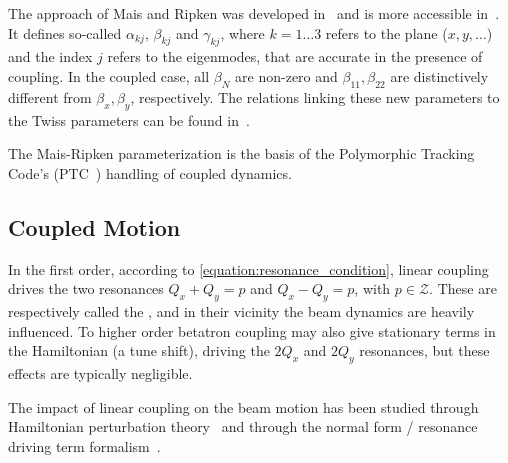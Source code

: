 The approach of Mais and Ripken was developed in~\cite{REPORT:Ripken:AllGerman} and is more accessible in~\cite{AIP:Willeke:Methods_Beam_Optics, REPORT:Borchardt:Calculation_Beam_Envelopes}.
It defines so-called  \(\alpha_{kj}\), \(\beta_{kj}\) and \(\gamma_{kj}\), where \(k = 1 \ldots 3\) refers to the plane (\(x, y, \ldots\)) and the index \(j\) refers to the eigenmodes, that are accurate in the presence of coupling.
In the coupled case, all \(\beta_N\) are non-zero and \(\beta_{11}, \beta_{22}\) are distinctively different from \(\beta_x, \beta_y\), respectively.
The relations linking these new parameters to the Twiss parameters can be found in~\cite{IOP:Lebedev:Betatron_Motion_Coupling}.

The Mais-Ripken parameterization is the basis of the Polymorphic Tracking Code's (PTC~\cite{CODE:Schmidt_Forest:PTC}) handling of coupled dynamics. 

\subsection{Coupled Motion}
\label{subsection:coupled_motion}

In the first order, according to \cref{equation:resonance_condition}, linear coupling drives the two resonances \(Q_x + Q_y = p\) and \(Q_x - Q_y = p\), with \(p \in \mathcal{Z}\).
These are respectively called the , and in their vicinity the beam dynamics are heavily influenced.
To higher order betatron coupling may also give stationary terms in the Hamiltonian (a tune shift), driving the \(2 Q_x\) and \(2 Q_y\) resonances, but these effects are typically negligible.

The impact of linear coupling on the beam motion has been studied through Hamiltonian perturbation theory~\cite{PHREV:Guignard:Betatron_Coupling_Radiation,BOOK:Wiedemann:Particle_Accelerator_Physics} and through the normal form / resonance driving term formalism~\cite{PHD:Franchi}.

